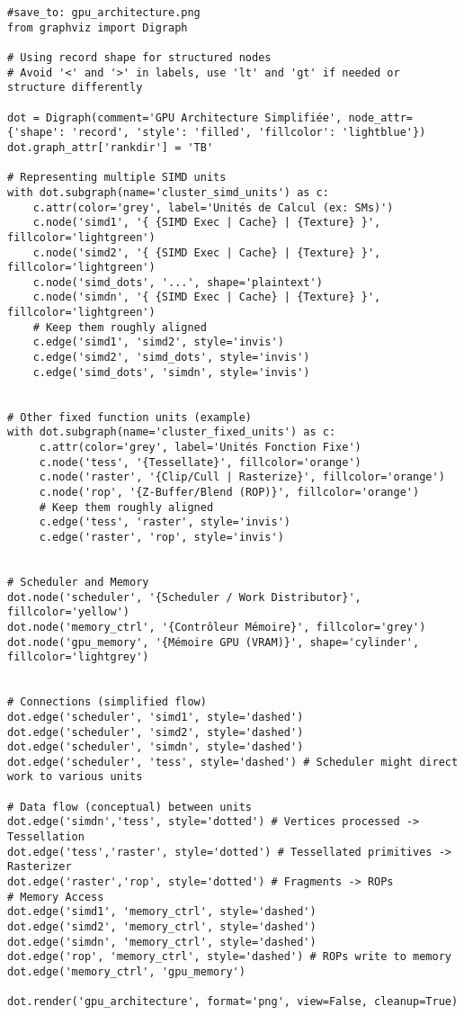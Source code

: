 \documentclass{article}
\begin{document}
\begin{verbatim}
#save_to: gpu_architecture.png
from graphviz import Digraph

# Using record shape for structured nodes
# Avoid '<' and '>' in labels, use 'lt' and 'gt' if needed or structure differently

dot = Digraph(comment='GPU Architecture Simplifiée', node_attr={'shape': 'record', 'style': 'filled', 'fillcolor': 'lightblue'})
dot.graph_attr['rankdir'] = 'TB'

# Representing multiple SIMD units
with dot.subgraph(name='cluster_simd_units') as c:
    c.attr(color='grey', label='Unités de Calcul (ex: SMs)')
    c.node('simd1', '{ {SIMD Exec | Cache} | {Texture} }', fillcolor='lightgreen')
    c.node('simd2', '{ {SIMD Exec | Cache} | {Texture} }', fillcolor='lightgreen')
    c.node('simd_dots', '...', shape='plaintext')
    c.node('simdn', '{ {SIMD Exec | Cache} | {Texture} }', fillcolor='lightgreen')
    # Keep them roughly aligned
    c.edge('simd1', 'simd2', style='invis')
    c.edge('simd2', 'simd_dots', style='invis')
    c.edge('simd_dots', 'simdn', style='invis')


# Other fixed function units (example)
with dot.subgraph(name='cluster_fixed_units') as c:
     c.attr(color='grey', label='Unités Fonction Fixe')
     c.node('tess', '{Tessellate}', fillcolor='orange')
     c.node('raster', '{Clip/Cull | Rasterize}', fillcolor='orange')
     c.node('rop', '{Z-Buffer/Blend (ROP)}', fillcolor='orange')
     # Keep them roughly aligned
     c.edge('tess', 'raster', style='invis')
     c.edge('raster', 'rop', style='invis')


# Scheduler and Memory
dot.node('scheduler', '{Scheduler / Work Distributor}', fillcolor='yellow')
dot.node('memory_ctrl', '{Contrôleur Mémoire}', fillcolor='grey')
dot.node('gpu_memory', '{Mémoire GPU (VRAM)}', shape='cylinder', fillcolor='lightgrey')


# Connections (simplified flow)
dot.edge('scheduler', 'simd1', style='dashed')
dot.edge('scheduler', 'simd2', style='dashed')
dot.edge('scheduler', 'simdn', style='dashed')
dot.edge('scheduler', 'tess', style='dashed') # Scheduler might direct work to various units

# Data flow (conceptual) between units
dot.edge('simdn','tess', style='dotted') # Vertices processed -> Tessellation
dot.edge('tess','raster', style='dotted') # Tessellated primitives -> Rasterizer
dot.edge('raster','rop', style='dotted') # Fragments -> ROPs
# Memory Access
dot.edge('simd1', 'memory_ctrl', style='dashed')
dot.edge('simd2', 'memory_ctrl', style='dashed')
dot.edge('simdn', 'memory_ctrl', style='dashed')
dot.edge('rop', 'memory_ctrl', style='dashed') # ROPs write to memory
dot.edge('memory_ctrl', 'gpu_memory')

dot.render('gpu_architecture', format='png', view=False, cleanup=True)
\end{verbatim}
\end{document}
